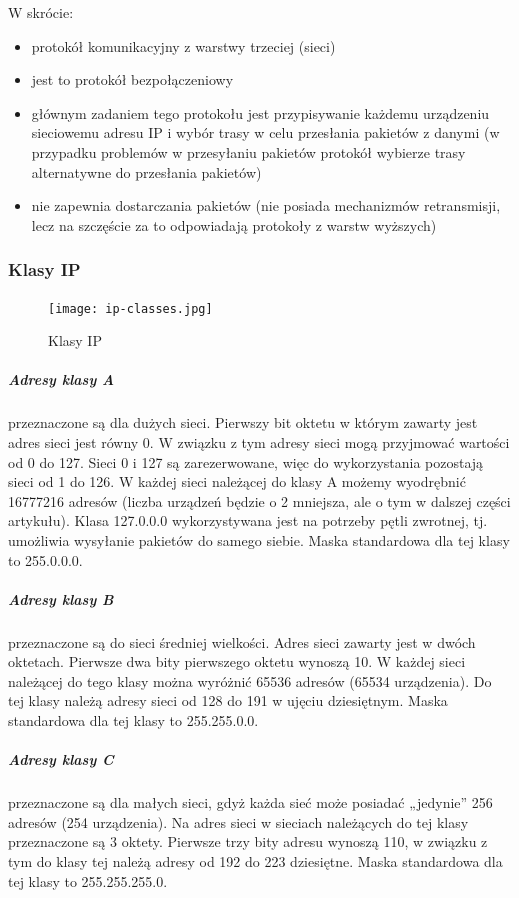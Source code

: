 \documentclass[a4paper,12pt,oneside]{book}
\begin{document}
				W skrócie:
				\begin{itemize}
					\item protokół komunikacyjny z warstwy trzeciej (sieci)
					\item jest to protokół bezpołączeniowy
					\item głównym zadaniem tego protokołu jest przypisywanie każdemu urządzeniu
					sieciowemu adresu IP i wybór trasy w celu przesłania pakietów z danymi (w
					przypadku problemów w przesyłaniu pakietów protokół wybierze trasy alternatywne
					do przesłania pakietów)
					\item nie zapewnia dostarczania pakietów (nie posiada mechanizmów retransmisji, lecz na
					szczęście za to odpowiadają protokoły z warstw wyższych)
				\end{itemize}
			\subsubsection{Klasy IP}
				\begin{figure}[h!]
					\centering\texttt{[image: ip-classes.jpg]}
					\caption{Klasy IP}
				\end{figure}
			\subparagraph{Adresy klasy A} przeznaczone są dla dużych sieci. Pierwszy bit oktetu w którym zawarty jest adres sieci jest równy 0. W związku z tym adresy sieci mogą przyjmować wartości od 0 do 127. Sieci 0 i 127 są zarezerwowane, więc do wykorzystania pozostają sieci od 1 do 126. W każdej sieci należącej do klasy A możemy wyodrębnić 16777216 adresów (liczba urządzeń będzie o 2 mniejsza, ale o tym w dalszej części artykułu). Klasa 127.0.0.0 wykorzystywana jest na potrzeby pętli zwrotnej, tj. umożliwia wysyłanie pakietów do samego siebie. Maska standardowa dla tej klasy to 255.0.0.0.
			
			\subparagraph{Adresy klasy B} przeznaczone są do sieci średniej wielkości. Adres sieci zawarty jest w dwóch oktetach. Pierwsze dwa bity pierwszego oktetu wynoszą 10. W każdej sieci należącej do tego klasy można wyróżnić 65536 adresów (65534 urządzenia). Do tej klasy należą adresy sieci od 128 do 191 w ujęciu dziesiętnym. Maska standardowa dla tej klasy to 255.255.0.0.
			
			\subparagraph{Adresy klasy C} przeznaczone są dla małych sieci, gdyż każda sieć może posiadać „jedynie” 256 adresów (254 urządzenia). Na adres sieci w sieciach należących do tej klasy przeznaczone są 3 oktety. Pierwsze trzy bity adresu wynoszą 110, w związku z tym do klasy tej należą adresy od 192 do 223 dziesiętne. Maska standardowa dla tej klasy to 255.255.255.0.
			
\end{document}
